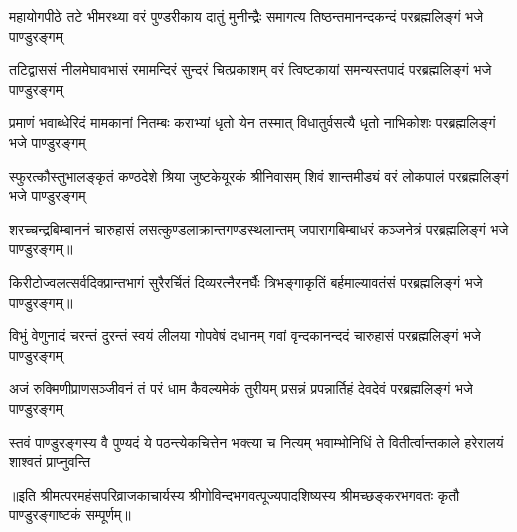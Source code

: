 


\fourlineindentedshloka
{महायोगपीठे तटे भीमरथ्या}
{वरं पुण्डरीकाय दातुं मुनीन्द्रैः}
{समागत्य तिष्ठन्तमानन्दकन्दं}
{परब्रह्मलिङ्गं भजे पाण्डुरङ्गम्} %

\fourlineindentedshloka
{तटिद्वाससं नीलमेघावभासं}
{रमामन्दिरं सुन्दरं चित्प्रकाशम्}
{वरं त्विष्टकायां समन्यस्तपादं}
{परब्रह्मलिङ्गं भजे पाण्डुरङ्गम्} %

\fourlineindentedshloka
{प्रमाणं भवाब्धेरिदं मामकानां}
{नितम्बः कराभ्यां धृतो येन तस्मात्}
{विधातुर्वसत्यै धृतो नाभिकोशः}
{परब्रह्मलिङ्गं भजे पाण्डुरङ्गम्} %

\fourlineindentedshloka
{स्फुरत्कौस्तुभालङ्कृतं कण्ठदेशे}
{श्रिया जुष्टकेयूरकं श्रीनिवासम्}
{शिवं शान्तमीड्यं वरं लोकपालं}
{परब्रह्मलिङ्गं भजे पाण्डुरङ्गम्} %

\fourlineindentedshloka
{शरच्चन्द्रबिम्बाननं चारुहासं}
{लसत्कुण्डलाक्रान्तगण्डस्थलान्तम्}
{जपारागबिम्बाधरं कञ्जनेत्रं}
{परब्रह्मलिङ्गं भजे पाण्डुरङ्गम्॥} %

\fourlineindentedshloka
{किरीटोज्वलत्सर्वदिक्प्रान्तभागं}
{सुरैरर्चितं दिव्यरत्नैरनर्घैः}
{त्रिभङ्गाकृतिं बर्हमाल्यावतंसं}
{परब्रह्मलिङ्गं भजे पाण्डुरङ्गम्॥} %

\fourlineindentedshloka
{विभुं वेणुनादं चरन्तं दुरन्तं}
{स्वयं लीलया गोपवेषं दधानम्}
{गवां वृन्दकानन्ददं चारुहासं}
{परब्रह्मलिङ्गं भजे पाण्डुरङ्गम्} %

\fourlineindentedshloka
{अजं रुक्मिणीप्राणसञ्जीवनं तं}
{परं धाम कैवल्यमेकं तुरीयम्}
{प्रसन्नं प्रपन्नार्तिहं देवदेवं}
{परब्रह्मलिङ्गं भजे पाण्डुरङ्गम्} %

\fourlineindentedshloka
{स्तवं पाण्डुरङ्गस्य वै पुण्यदं ये}
{पठन्त्येकचित्तेन भक्त्या च नित्यम्}
{भवाम्भोनिधिं ते वितीर्त्वान्तकाले}
{हरेरालयं शाश्वतं प्राप्नुवन्ति}

॥इति श्रीमत्परमहंसपरिव्राजकाचार्यस्य श्रीगोविन्दभगवत्पूज्यपादशिष्यस्य श्रीमच्छङ्करभगवतः कृतौ पाण्डुरङ्गाष्टकं सम्पूर्णम्॥